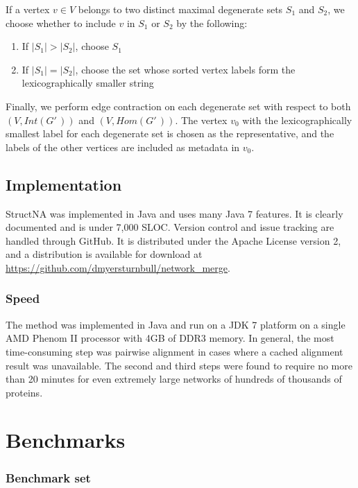 \documentclass[12pt,twoside]{article}
\newenvironment{denseenum}{
\begin{enumerate}
  \setlength{\itemsep}{0.1em}
  \setlength{\parskip}{0em}
  \setlength{\parsep}{0em}
}{\end{enumerate}}
\begin{document}
If a vertex $v \in V$ belongs to two distinct maximal degenerate sets $S_1$ and $S_2$, we choose whether to include $v$ in $S_1$ or $S_2$ by the following:
\begin{denseenum}
\item If $|S_1| > |S_2|$, choose $S_1$
\item If $|S_1| = |S_2|$, choose the set whose sorted vertex labels form the lexicographically smaller string
\end{denseenum}

Finally, we perform edge contraction on each degenerate set with respect to both $(V,Int(G'\,\!))$ and $(V,Hom(G'\,\!))$.
The vertex $v_0$ with the lexicographically smallest label for each degenerate set is chosen as the representative, and the labels of the other vertices are included as metadata in $v_0$.

\subsection{Implementation}

StructNA was implemented in Java and uses many Java 7 features. It is clearly documented and is under 7,000 SLOC. Version control and issue tracking are handled through GitHub. It is distributed under the Apache License version 2, and a distribution is available for download at \url{https://github.com/dmyersturnbull/network_merge}.

\subsubsection{Speed}

The method was implemented in Java and run on a JDK 7 platform on a single AMD Phenom II processor with 4GB of DDR3 memory. In general, the most time-consuming step was pairwise alignment in cases where a cached alignment result was unavailable. The second and third steps were found to require no more than 20 minutes for even extremely large networks of hundreds of thousands of proteins.

\section{Benchmarks}

\subsubsection{Benchmark set}
\end{document}
